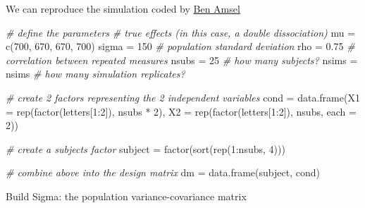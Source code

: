 \documentclass[
]{book}
\newenvironment{Shaded}{\begin{snugshade}}{\end{snugshade}}
\newcommand{\AttributeTok}[1]{\textcolor[rgb]{0.77,0.63,0.00}{#1}}
\newcommand{\CommentTok}[1]{\textcolor[rgb]{0.56,0.35,0.01}{\textit{#1}}}
\newcommand{\DecValTok}[1]{\textcolor[rgb]{0.00,0.00,0.81}{#1}}
\newcommand{\FloatTok}[1]{\textcolor[rgb]{0.00,0.00,0.81}{#1}}
\newcommand{\FunctionTok}[1]{\textcolor[rgb]{0.00,0.00,0.00}{#1}}
\newcommand{\NormalTok}[1]{#1}
\newcommand{\OtherTok}[1]{\textcolor[rgb]{0.56,0.35,0.01}{#1}}
\newcommand{\SpecialCharTok}[1]{\textcolor[rgb]{0.00,0.00,0.00}{#1}}
\begin{document}
We can reproduce the simulation coded by \href{https://cognitivedatascientist.com/2015/12/14/power-simulation-in-r-the-repeated-measures-anova-5/}{Ben Amsel}

\begin{Shaded}
\begin{Highlighting}[]
\CommentTok{\# define the parameters}
\CommentTok{\# true effects (in this case, a double dissociation)}
\NormalTok{mu }\OtherTok{=} \FunctionTok{c}\NormalTok{(}\DecValTok{700}\NormalTok{, }\DecValTok{670}\NormalTok{, }\DecValTok{670}\NormalTok{, }\DecValTok{700}\NormalTok{) }
\NormalTok{sigma }\OtherTok{=} \DecValTok{150}  \CommentTok{\# population standard deviation}
\NormalTok{rho }\OtherTok{=} \FloatTok{0.75} \CommentTok{\# correlation between repeated measures}
\NormalTok{nsubs }\OtherTok{=} \DecValTok{25} \CommentTok{\# how many subjects?}
\NormalTok{nsims }\OtherTok{=}\NormalTok{ nsims }\CommentTok{\# how many simulation replicates?}
 
\CommentTok{\# create 2 factors representing the 2 independent variables}
\NormalTok{cond }\OtherTok{=} \FunctionTok{data.frame}\NormalTok{(}\AttributeTok{X1 =} \FunctionTok{rep}\NormalTok{(}\FunctionTok{factor}\NormalTok{(letters[}\DecValTok{1}\SpecialCharTok{:}\DecValTok{2}\NormalTok{]), nsubs }\SpecialCharTok{*} \DecValTok{2}\NormalTok{),}
                  \AttributeTok{X2 =} \FunctionTok{rep}\NormalTok{(}\FunctionTok{factor}\NormalTok{(letters[}\DecValTok{1}\SpecialCharTok{:}\DecValTok{2}\NormalTok{]), nsubs, }\AttributeTok{each =} \DecValTok{2}\NormalTok{))}
 
\CommentTok{\# create a subjects factor}
\NormalTok{subject }\OtherTok{=} \FunctionTok{factor}\NormalTok{(}\FunctionTok{sort}\NormalTok{(}\FunctionTok{rep}\NormalTok{(}\DecValTok{1}\SpecialCharTok{:}\NormalTok{nsubs, }\DecValTok{4}\NormalTok{)))}
 
\CommentTok{\# combine above into the design matrix}
\NormalTok{dm }\OtherTok{=} \FunctionTok{data.frame}\NormalTok{(subject, cond)}
\end{Highlighting}
\end{Shaded}

Build Sigma: the population variance-covariance matrix
\end{document}
